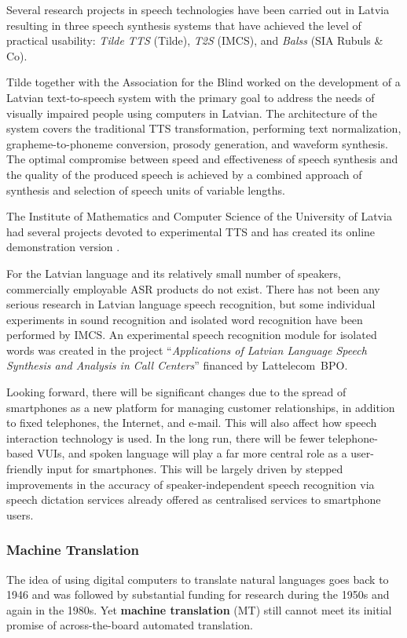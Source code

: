 \begin{multicols}{2}
Several research projects in speech technologies have been carried out in Latvia resulting in three speech synthesis systems that have achieved the level of practical usability: \textit{Tilde TTS} (Tilde), \textit{T2S} (IMCS), and \textit{Balss} (SIA Rubuls \& Co). 

Tilde together with the Association for the Blind worked on the development of a Latvian text-to-speech system \cite{Meta19} with the primary goal to address the needs of visually impaired people using computers in Latvian.
The architecture of the system covers the traditional TTS transformation, performing text normalization, grapheme-to-phoneme conversion, prosody generation, and waveform synthesis.
The optimal compromise between speed and effectiveness of speech synthesis and the quality of the produced speech is achieved by a combined approach of synthesis and selection of speech units of variable lengths.

The Institute of Mathematics and Computer Science of the University of Latvia had several projects devoted to experimental TTS \cite{Meta20, Meta21} and has created its online demonstration version \cite{Meta22}.

For the Latvian language and its relatively small number of speakers, commercially employable ASR products do not exist.
There has not been any serious research in Latvian language speech recognition, but some individual experiments in sound recognition and isolated word recognition have been performed by IMCS.
An experimental speech recognition module for isolated words was created in the project ``\textit{Applications of Latvian Language Speech Synthesis and Analysis in Call Centers}'' financed by Lattelecom~BPO.

Looking forward, there will be significant changes due to the spread of smartphones as a new platform for managing customer relationships, in addition to fixed telephones, the Internet, and e-mail.
This will also affect how speech interaction technology is used.
In the long run, there will be fewer telephone-based VUIs, and spoken language will play a far more central role as a user-friendly input for smartphones.
This will be largely driven by stepped improvements in the accuracy of speaker-independent speech recognition via speech dictation services already offered as centralised services to smartphone users. 

\subsubsection{Machine Translation}
The idea of using digital computers to translate natural languages goes back to 1946 and was followed by substantial funding for research during the 1950s and again in the 1980s.
Yet \textbf{machine translation} (MT) still cannot meet its initial promise of across-the-board automated translation.  


\end{multicols}
